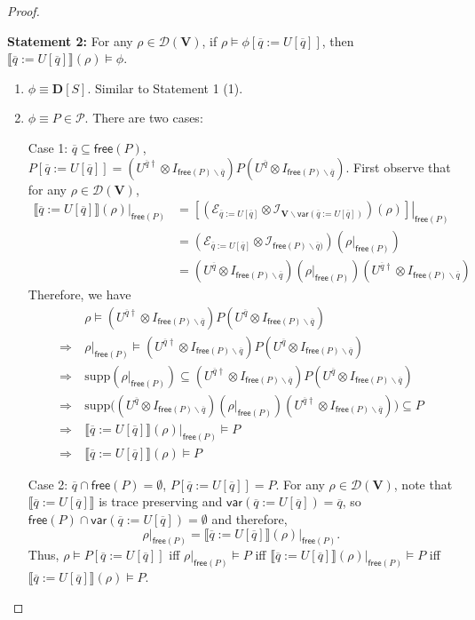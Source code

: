 \documentclass[conference,compsoc, 10pt]{IEEEtran}
\newcommand {\qbar} {{\overline{q}}}
\newcommand {\qU} {{\overline{q}:=U[\overline{q}]}}
\newcommand {\cD } {{\mathcal{D}}}
\newcommand {\cP } {{\mathcal{P}}}
\newcommand {\cE } {{\mathcal{E}}}
\newcommand {\cI } {{\mathcal{I}}}
\newcommand {\id } {{I}}
\newcommand {\bD} {{\mathbf{D}}}
\newcommand {\free }[1] {{\mathsf{free}\left(#1\right)}}
\newcommand {\rt }[2] {{\left.{#1}\right|_{#2}}}
\newcommand {\vars } {\mathbf{V}}
\newcommand {\var } {\mathsf{var}}
\newcommand {\sem}[1] {\llbracket#1\rrbracket}
\newcommand {\supp } {{\mathrm{supp}}}
\begin{document}
\begin{appendices}
\begin{proof}
\begin{enumerate}
				
			\end{enumerate}
			
			
			{\bf Statement 2:} For any $\rho\in\cD(\vars)$, if $\rho\models\phi[\qU]$, then $\sem{\qU}(\rho)\models\phi$.
			\begin{enumerate}
				\item $\phi\equiv \bD[S]$. Similar to Statement 1 (1).
				
				\item $\phi\equiv P\in\cP$. There are two cases: 
				
				Case 1: $\qbar\subseteq\free{P}$, $ P[\qU] = (U^{\qbar\dag}\otimes\id_{\free{P}\backslash \qbar})P(U^{\qbar}\otimes\id_{\free{P}\backslash \qbar})$. First observe that for any $\rho\in\cD(\vars)$,			
				\begin{align*}
				\rt{\sem{\qU}(\rho)}{\free{P}} &= \rt{\left[(\cE_{\qU}\otimes\cI_{\vars\backslash\var(\qU)})(\rho)\right]}{\free{P}} \\
				&= (\cE_{\qU}\otimes\cI_{\free{P}\backslash \qbar)})(\rt{\rho}{\free{P}}) \\
				&= (U^{\qbar}\otimes\id_{\free{P}\backslash \qbar})(\rt{\rho}{\free{P}}) (U^{\qbar\dag}\otimes\id_{\free{P}\backslash \qbar})
				\end{align*}
				Therefore, we have
				\begin{align*}
				&\rho\models (U^{\qbar\dag}\otimes\id_{\free{P}\backslash \qbar})P(U^{\qbar}\otimes\id_{\free{P}\backslash \qbar}) \\
				\Longrightarrow\ &\rt{\rho}{\free{P}}\models (U^{\qbar\dag}\otimes\id_{\free{P}\backslash \qbar})P(U^{\qbar}\otimes\id_{\free{P}\backslash \qbar}) \\
				\Longrightarrow\ &\supp(\rt{\rho}{\free{P}})\subseteq (U^{\qbar\dag}\otimes\id_{\free{P}\backslash \qbar})P(U^{\qbar}\otimes\id_{\free{P}\backslash \qbar}) \\
				\Longrightarrow\ &\supp\big((U^{\qbar}\otimes\id_{\free{P}\backslash \qbar})(\rt{\rho}{\free{P}}) (U^{\qbar\dag}\otimes\id_{\free{P}\backslash \qbar})\big)\subseteq P \\
				\Longrightarrow\ &\rt{\sem{\qU}(\rho)}{\free{P}}\models P \\
				\Longrightarrow\ &\sem{\qU}(\rho)\models P
				\end{align*}
				
				Case 2: $\qbar\cap\free{P} = \emptyset$, $ P[\qU] = P$. For any $\rho\in\cD(\vars)$, note that $\sem{\qU}$ is trace preserving and $\var(\qU) = \qbar$, so $\free{P}\cap\var(\qU) = \emptyset$ and therefore, 
				$$\rt{\rho}{\free{P}} = \rt{\sem{\qU}(\rho)}{\free{P}}.$$
				Thus, $\rho\models P[\qU]$ iff $\rt{\rho}{\free{P}}\models P$ iff $\rt{\sem{\qU}(\rho)}{\free{P}}\models P$ iff $\sem{\qU}(\rho)\models P$.
				

\end{enumerate}
\end{proof}
\end{appendices}
\end{document}
